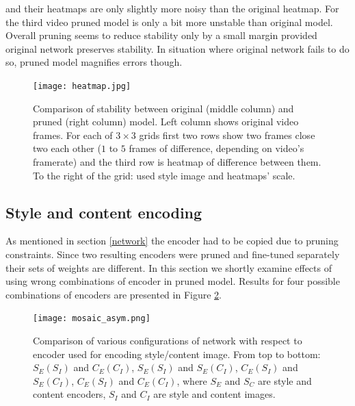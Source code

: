 \documentclass[../Main.tex]{subfiles}
\begin{document}
and their heatmaps are only slightly more noisy than the original heatmap.
For the third video pruned model is only a bit more unstable than original model.
Overall pruning seems to reduce stability only by a small margin provided original network
preserves stability. In situation where original network fails to do so, pruned model
magnifies errors though.
\begin{figure}[h!]
\centering
    \texttt{[image: heatmap.jpg]}
    \caption{Comparison of stability between original (middle column) and pruned
    (right column) model. Left column shows original video frames. For each of
    $3\times3$ grids first two rows show two frames close two each other
    ($1$ to $5$ frames of difference, depending on video's framerate) and the third
    row is heatmap of difference between them. To the right of the grid: used style
    image and heatmaps' scale.
    }
    \label{fig:heatmap}
\end{figure} 



\subsection{Style and content encoding} \label{two_encoders}
As mentioned in section \ref{network} the encoder had to be copied due to pruning
constraints. Since two resulting encoders were pruned and fine-tuned separately 
their sets of weights are different. In this section we shortly examine effects
of using wrong combinations of encoder in pruned model. Results for four possible combinations
of encoders are presented in Figure \ref{fig:mosaic_asym}.

        \begin{figure}[h!]
        \centering
            \texttt{[image: mosaic\_asym.png]}
            \caption{Comparison of various configurations of network with respect
            to encoder used for encoding style/content image. From top to bottom:
            $S_E(S_I)$ and $C_E(C_I)$, $S_E(S_I)$ and $S_E(C_I)$,
            $C_E(S_I)$ and $S_E(C_I)$, $C_E(S_I)$ and $C_E(C_I)$, where
            $S_E$ and $S_C$ are style and content encoders, $S_I$ and $C_I$ are 
            style and content images.
            }
            \label{fig:mosaic_asym}
        \end{figure}
        
\end{document}
